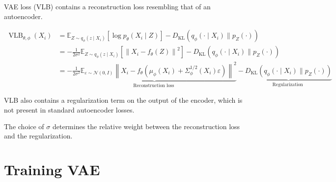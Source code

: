 \documentclass{report}
\begin{document}
\begin{concept}
    VAE loss (VLB) contains a reconstruction loss resembling that of an autoencoder.

    $$
    \begin{aligned}
    \operatorname{VLB}_{\theta, \phi}\left(X_{i}\right) & =\mathbb{E}_{Z \sim q_{\phi}\left(z \mid X_{i}\right)}\left[\log p_{\theta}\left(X_{i} \mid Z\right)\right]-D_{\mathrm{KL}}\left(q_{\phi}\left(\cdot \mid X_{i}\right) \| p_{Z}(\cdot)\right) \\
    & =-\frac{1}{2 \sigma^{2}} \mathbb{E}_{Z \sim q_{\phi}\left(z \mid X_{i}\right)}\left[\left\|X_{i}-f_{\theta}(Z)\right\|^{2}\right]-D_{\mathrm{KL}}\left(q_{\phi}\left(\cdot \mid X_{i}\right) \| p_{Z}(\cdot)\right) \\
    & =-\underbrace{\frac{1}{2 \sigma^{2}} \mathbb{E}_{\varepsilon \sim \mathcal{N}(0, I)}\left\|X_{i}-f_{\theta}\left(\mu_{\phi}\left(X_{i}\right)+\Sigma_{\phi}^{1 / 2}\left(X_{i}\right) \varepsilon\right)\right\|^{2}}_{\text {Reconstruction loss }}-\underbrace{D_{\mathrm{KL}}\left(q_{\phi}\left(\cdot \mid X_{i}\right) \| p_{Z}(\cdot)\right)}_{\text {Regularization }}
    \end{aligned}
    $$

    VLB also contains a regularization term on the output of the encoder, which is not present in standard autoencoder losses.

    The choice of $\sigma$ determines the relative weight between the reconstruction loss and the regularization.
\end{concept}

\section{Training VAE}
\end{document}
